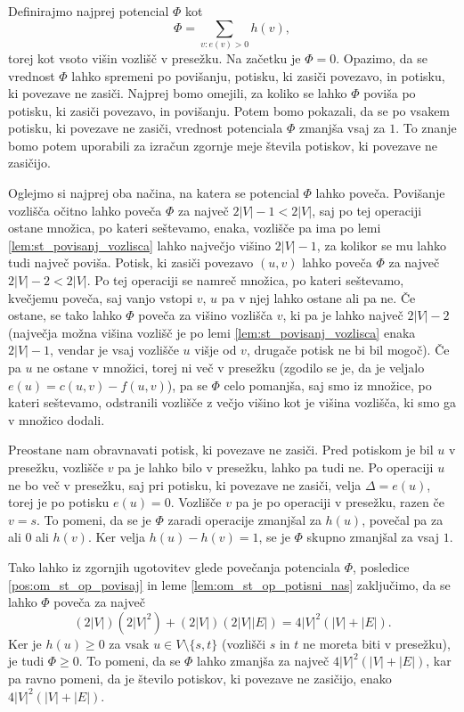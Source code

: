 \documentclass[mat1]{fmfdelo}
\begin{document}
\begin{dokaz}
Definirajmo najprej potencial $\Phi$ kot \[\Phi = \sum_{v:e(v) > 0} h(v),\] torej kot vsoto višin vozlišč v presežku. Na začetku je $\Phi = 0$. Opazimo, da se vrednost $\Phi$ lahko spremeni po povišanju, potisku, ki zasiči povezavo, in potisku, ki povezave ne zasiči. Najprej bomo omejili, za koliko se lahko $\Phi$ poviša po potisku, ki zasiči povezavo, in povišanju. Potem bomo pokazali, da se po vsakem potisku, ki povezave ne zasiči, vrednost potenciala $\Phi$ zmanjša vsaj za $1$. To znanje bomo potem uporabili za izračun zgornje meje števila potiskov, ki povezave ne zasičijo.

Oglejmo si najprej oba načina, na katera se potencial $\Phi$ lahko poveča. Povišanje vozlišča očitno lahko poveča $\Phi$ za največ $2|V| - 1 < 2|V|$, saj po tej operaciji ostane množica, po kateri seštevamo, enaka, vozlišče pa ima po lemi \ref{lem:st_povisanj_vozlisca} lahko največjo višino $2|V|-1$, za kolikor se mu lahko tudi največ poviša. Potisk, ki zasiči povezavo $(u,v)$ lahko poveča $\Phi$ za največ $2|V|-2 < 2|V|$. Po tej operaciji se namreč množica, po kateri seštevamo, kvečjemu poveča, saj vanjo vstopi $v$, $u$ pa v njej lahko ostane ali pa ne. Če ostane, se tako lahko $\Phi$ poveča za višino vozlišča $v$, ki pa je lahko največ $2|V|-2$ (največja možna višina vozlišč je po lemi \ref{lem:st_povisanj_vozlisca} enaka $2|V| - 1$, vendar je vsaj vozlišče $u$ višje od $v$, drugače potisk ne bi bil mogoč). Če pa $u$ ne ostane v množici, torej ni več v presežku (zgodilo se je, da je veljalo $e(u) = c(u,v) - f(u,v)$), pa se $\Phi$ celo pomanjša, saj smo iz množice, po kateri seštevamo, odstranili vozlišče z večjo višino kot je višina vozlišča, ki smo ga v množico dodali.

Preostane nam obravnavati potisk, ki povezave ne zasiči. Pred potiskom je bil $u$ v presežku, vozlišče $v$ pa je lahko bilo v presežku, lahko pa tudi ne. Po operaciji $u$ ne bo več v presežku, saj pri potisku, ki povezave ne zasiči, velja $\Delta = e(u)$, torej je po potisku $e(u) = 0$. Vozlišče $v$ pa je po operaciji v presežku, razen če $v = s$. To pomeni, da se je $\Phi$ zaradi operacije zmanjšal za $h(u)$, povečal pa za ali $0$ ali $h(v)$. Ker velja $h(u) - h(v) = 1$, se je $\Phi$ skupno zmanjšal za vsaj $1$.

Tako lahko iz zgornjih ugotovitev glede povečanja potenciala $\Phi$, posledice \ref{pos:om_st_op_povisaj} in leme \ref{lem:om_st_op_potisni_nas} zaključimo, da se lahko $\Phi$ poveča za največ \[(2|V|) (2|V|^2) + (2|V|) (2|V||E|) = 4|V|^2 (|V| + |E|).\] Ker je $h(u) \geq 0$ za vsak $u \in V \setminus \{s,t\}$ (vozlišči $s$ in $t$ ne moreta biti v presežku), je tudi $\Phi \geq 0$. To pomeni, da se $\Phi$ lahko zmanjša za največ $4|V|^2 (|V| + |E|)$, kar pa ravno pomeni, da je število potiskov, ki povezave ne zasičijo, enako $4|V|^2 (|V| + |E|)$.
\end{dokaz}
\end{document}
